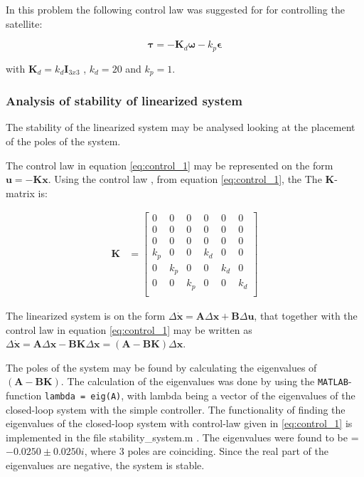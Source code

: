 In this problem the following control law was suggested for for controlling the satellite: 

\begin{equation}
  \boldsymbol{\tau} = -\mathbf{K}_d \boldsymbol{\omega} - k_p \boldsymbol{\epsilon}
  \label{eq:control_1}
\end{equation}

with $\mathbf{K}_d = k_d \mathbf{I}_{3x3}$ , $k_d = 20$ and $k_p = 1$.  

\subsubsection*{Analysis of stability of  linearized system}

The stability of the linearized system may be analysed looking at the placement of the poles of the system.

The control law in equation \eqref{eq:control_1} may be represented on the form $ \mathbf{u} = - \mathbf{K} \mathbf{x}$. Using the control law , from equation \eqref{eq:control_1}, the The $ \mathbf{K} $-matrix is:

\begin{equation}
\begin{aligned}
    \mathbf{K}
    &=
    \begin{bmatrix}
    0 & 0 & 0 & 0 & 0 & 0 \\ 
    0 & 0 & 0 & 0 & 0 & 0 \\ 
    0 & 0 & 0 & 0 & 0 & 0 \\ 
    k_p & 0 & 0 & k_d & 0 & 0 \\ 
    0 & k_p & 0 & 0 & k_d & 0 \\ 
    0 & 0 & k_p & 0 & 0 & k_d \\ 
    \end{bmatrix}
    \label{eq:K}
\end{aligned}
\end{equation}

The linearized system is on the form $\Delta \dot{ \mathbf{x}} = \mathbf{A} \Delta \mathbf{x} + \mathbf{B} \Delta \mathbf{u}$, that together with the control law in equation \eqref{eq:control_1} may be written as $\Delta \dot{\mathbf{x}} = \mathbf{A}\Delta \mathbf{x} - \mathbf{B K} \Delta \mathbf{x} = ( \mathbf{A} - \mathbf{B K} ) \Delta \mathbf{x} $.

The poles of the system may be found by calculating the eigenvalues of $( \mathbf{A}   - \mathbf{B K} )$. The calculation of the eigenvalues was done by using the \texttt{MATLAB}-function \texttt{lambda = eig(A)}, with lambda being a vector of the eigenvalues of the closed-loop system with the simple controller. The functionality of finding the eigenvalues of the closed-loop system with control-law given in \eqref{eq:control_1} is implemented in the file
{\color{blue}  stability\_system.m }. The eigenvalues were found to be = $- 0.0250 \pm 0.0250i$, where 3 poles are coinciding. Since the real part of the eigenvalues are negative, the system is stable.


